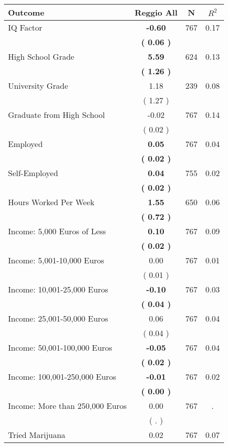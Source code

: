 \begin{tabular}{lccc}
\toprule
 \textbf{Outcome} & \textbf{Reggio All} & \textbf{N} & \textbf{$ R^2$} \\
\midrule
IQ Factor & \textbf{    -0.60} & 767 &      0.17 \\ 
 & \textbf{(     0.06 )} & \\
High School Grade & \textbf{     5.59} & 624 &      0.13 \\ 
 & \textbf{(     1.26 )} & \\
University Grade &      1.18 & 239 &      0.08 \\ 
 & (     1.27 ) & \\
Graduate from High School &     -0.02 & 767 &      0.14 \\ 
 & (     0.02 ) & \\
Employed & \textbf{     0.05} & 767 &      0.04 \\ 
 & \textbf{(     0.02 )} & \\
Self-Employed & \textbf{     0.04} & 755 &      0.02 \\ 
 & \textbf{(     0.02 )} & \\
Hours Worked Per Week & \textbf{     1.55} & 650 &      0.06 \\ 
 & \textbf{(     0.72 )} & \\
Income: 5,000 Euros of Less & \textbf{     0.10} & 767 &      0.09 \\ 
 & \textbf{(     0.02 )} & \\
Income: 5,001-10,000 Euros &      0.00 & 767 &      0.01 \\ 
 & (     0.01 ) & \\
Income: 10,001-25,000 Euros & \textbf{    -0.10} & 767 &      0.03 \\ 
 & \textbf{(     0.04 )} & \\
Income: 25,001-50,000 Euros &      0.06 & 767 &      0.04 \\ 
 & (     0.04 ) & \\
Income: 50,001-100,000 Euros & \textbf{    -0.05} & 767 &      0.04 \\ 
 & \textbf{(     0.02 )} & \\
Income: 100,001-250,000 Euros & \textbf{    -0.01} & 767 &      0.02 \\ 
 & \textbf{(     0.00 )} & \\
Income: More than 250,000 Euros &      0.00 & 767 &         . \\ 
 & (        . ) & \\
Tried Marijuana &      0.02 & 767 &      0.07 \\ 

\end{tabular}
